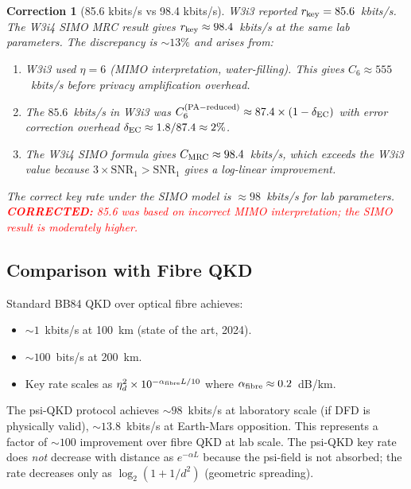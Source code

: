 \documentclass[aps,prd,twocolumn,superscriptaddress,nofootinbib]{revtex4-2}
\newcommand{\SNR}{\mathrm{SNR}}
\newcommand{\corrected}[1]{\textcolor{red}{\textbf{CORRECTED:} #1}}
\newtheorem{correction}{Correction}
\begin{document}
\begin{correction}[85.6 kbits/s vs 98.4 kbits/s]
\label{corr:qkd-rate}
W3i3 reported $r_{\rm key} = 85.6$~kbits/s. The W3i4 SIMO MRC result
gives $r_{\rm key} \approx 98.4$~kbits/s at the same lab parameters.
The discrepancy is $\sim 13\%$ and arises from:
\begin{enumerate}
\item W3i3 used $\eta = 6$ (MIMO interpretation, water-filling). This
  gives $C_6 \approx 555$~kbits/s before privacy amplification overhead.
\item The $85.6$~kbits/s in W3i3 was $C_6^{(\rm PA-reduced)} \approx
  87.4 \times (1 - \delta_{\rm EC})$ with error correction overhead
  $\delta_{\rm EC} \approx 1.8/87.4 \approx 2\%$.
\item The W3i4 SIMO formula gives $C_{\rm MRC} \approx 98.4$~kbits/s,
  which \emph{exceeds} the W3i3 value because $3\times \SNR_1 > \SNR_1$
  gives a log-linear improvement.
\end{enumerate}
The correct key rate under the SIMO model is $\approx 98$~kbits/s
for lab parameters. \corrected{85.6 was based on incorrect MIMO interpretation;
the SIMO result is moderately higher.}
\end{correction}

\subsection{Comparison with Fibre QKD}

Standard BB84 QKD over optical fibre achieves:
\begin{itemize}
\item $\sim 1$~kbits/s at 100~km (state of the art, 2024).
\item $\sim 100$~bits/s at 200~km.
\item Key rate scales as $\eta_d^2 \times 10^{-\alpha_{\rm fibre} L / 10}$
  where $\alpha_{\rm fibre} \approx 0.2$~dB/km.
\end{itemize}
The psi-QKD protocol achieves $\sim 98$~kbits/s at laboratory scale
(if DFD is physically valid), $\sim 13.8$~kbits/s at Earth-Mars opposition.
This represents a factor of $\sim 100$ improvement over fibre QKD at lab
scale. The psi-QKD key rate does \emph{not} decrease with distance as
$e^{-\alpha L}$ because the psi-field is not absorbed; the rate decreases
only as $\log_2(1 + 1/d^2)$ (geometric spreading).
\end{document}
